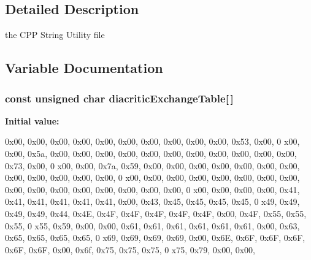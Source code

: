 \subsection{Detailed Description}
the CPP String Utility file 

\subsection{Variable Documentation}
\subsubsection[{diacriticExchangeTable}]{\setlength{\rightskip}{0pt plus 5cm}const unsigned char diacriticExchangeTable[$\,$]}\label{CPPStringUtils_8cc_af72653d4ea4ec44c18974a29d6991d5e}
{\bfseries Initial value:}
\begin{DoxyCode}

{
        
    
        0x00, 0x00, 0x00, 0x00, 0x00, 0x00, 0x00, 0x00, 0x00, 0x00, 0x53, 0x00, 0
      x00, 0x00, 0x5a, 0x00, 
        0x00, 0x00, 0x00, 0x00, 0x00, 0x00, 0x00, 0x00, 0x00, 0x00, 0x73, 0x00, 0
      x00, 0x00, 0x7a, 0x59, 
        0x00, 0x00, 0x00, 0x00, 0x00, 0x00, 0x00, 0x00, 0x00, 0x00, 0x00, 0x00, 0
      x00, 0x00, 0x00, 0x00, 
        0x00, 0x00, 0x00, 0x00, 0x00, 0x00, 0x00, 0x00, 0x00, 0x00, 0x00, 0x00, 0
      x00, 0x00, 0x00, 0x00, 
        0x41, 0x41, 0x41, 0x41, 0x41, 0x41, 0x00, 0x43, 0x45, 0x45, 0x45, 0x45, 0
      x49, 0x49, 0x49, 0x49, 
        0x44, 0x4E, 0x4F, 0x4F, 0x4F, 0x4F, 0x4F, 0x00, 0x4F, 0x55, 0x55, 0x55, 0
      x55, 0x59, 0x00, 0x00, 
        0x61, 0x61, 0x61, 0x61, 0x61, 0x61, 0x00, 0x63, 0x65, 0x65, 0x65, 0x65, 0
      x69, 0x69, 0x69, 0x69, 
        0x00, 0x6E, 0x6F, 0x6F, 0x6F, 0x6F, 0x6F, 0x00, 0x6f, 0x75, 0x75, 0x75, 0
      x75, 0x79, 0x00, 0x00, 
}
\end{DoxyCode}
